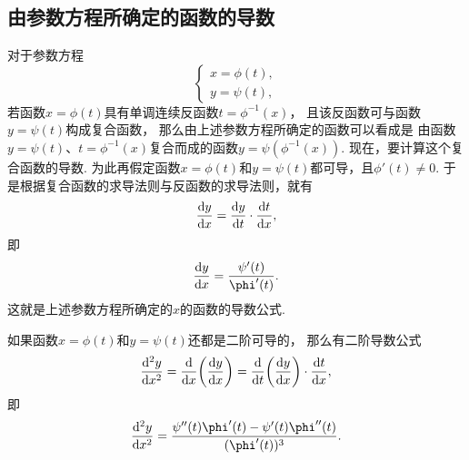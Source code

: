 \subsection{由参数方程所确定的函数的导数}
对于参数方程\begin{equation*}
	\left\{ \begin{array}{l}
		x = \phi(t), \\
		y = \psi(t),
	\end{array} \right.
\end{equation*}
若函数\(x = \phi(t)\)具有单调连续反函数\(t=\phi^{-1}(x)\)，
且该反函数可与函数\(y = \psi(t)\)构成复合函数，
那么由上述参数方程所确定的函数可以看成是
由函数\(y=\psi(t)\)、\(t=\phi^{-1}(x)\)复合而成的函数\(y=\psi(\phi^{-1}(x))\).
现在，要计算这个复合函数的导数.
为此再假定函数\(x = \phi(t)\)和\(y = \psi(t)\)都可导，且\(\phi'(t) \neq 0\).
于是根据复合函数的求导法则与反函数的求导法则，就有\begin{equation*}
	\dv{y}{x}
	= \dv{y}{t} \cdot \dv{t}{x},
\end{equation*}
即\begin{equation}\label{equation:导数.参数方程确定的函数的一阶导数}
	\dv{y}{x}
	= \frac{\psi'(t)}{\phi'(t)}.
\end{equation}
这就是上述参数方程所确定的\(x\)的函数的导数公式.

如果函数\(x = \phi(t)\)和\(y = \psi(t)\)还都是二阶可导的，
那么有二阶导数公式\begin{equation*}
	\dv[2]{y}{x}
	= \dv{x}(\dv{y}{x})
	= \dv{t}(\dv{y}{x}) \cdot \dv{t}{x},
\end{equation*}
即\begin{equation}\label{equation:导数.参数方程确定的函数的二阶导数}
	\dv[2]{y}{x}
	= \frac{\psi''(t) \phi'(t) - \psi'(t) \phi''(t)}{(\phi'(t))^3}.
\end{equation}

